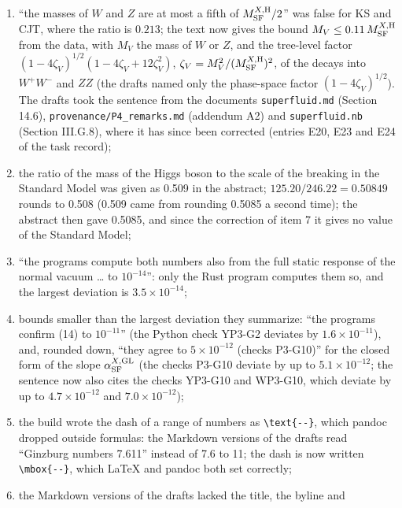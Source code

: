 \documentclass[
  10pt,
]{article}
\providecommand{\tightlist}{%
  \setlength{\itemsep}{0pt}\setlength{\parskip}{0pt}}
\begin{document}
\begin{enumerate}
\def\labelenumi{\arabic{enumi}.}
\tightlist
\item
  ``the masses of \(W\) and \(Z\) are at most a fifth of
  \(M^{X,{\rm H}}_{\rm SF}/2\)'' was false for KS and CJT, where the
  ratio is \(0.213\); the text now gives the bound
  \(M_V\le0.11\,M^{X,{\rm H}}_{\rm SF}\) from the data, with \(M_V\) the
  mass of \(W\) or \(Z\), and the tree-level factor
  \((1-4\zeta_V)^{1/2}(1-4\zeta_V+12\zeta_V^2)\),
  \(\zeta_V=M_V^2/(M^{X,{\rm H}}_{\rm SF})^2\), of the decays into
  \(W^+W^-\) and \(ZZ\) (the drafts named only the phase-space factor
  \((1-4\zeta_V)^{1/2}\)). The drafts took the sentence from the
  documents \texttt{superfluid.md} (Section 14.6),
  \texttt{provenance/P4\_remarks.md} (addendum A2) and
  \texttt{superfluid.nb} (Section III.G.8), where it has since been
  corrected (entries E20, E23 and E24 of the task record);
\item
  the ratio of the mass of the Higgs boson to the scale of the breaking
  in the Standard Model was given as 0.509 in the abstract;
  \(125.20/246.22=0.50849\) rounds to 0.508 (0.509 came from rounding
  0.5085 a second time); the abstract then gave 0.5085, and since the
  correction of item 7 it gives no value of the Standard Model;
\item
  ``the programs compute both numbers also from the full static response
  of the normal vacuum \ldots{} to \(10^{-14}\)'': only the Rust program
  computes them so, and the largest deviation is \(3.5\times10^{-14}\);
\item
  bounds smaller than the largest deviation they summarize: ``the
  programs confirm (14) to \(10^{-11}\)'' (the Python check YP3-G2
  deviates by \(1.6\times10^{-11}\)), and, rounded down, ``they agree to
  \(5\times10^{-12}\) (checks P3-G10)'' for the closed form of the slope
  \(\alpha^{X,{\rm GL}}_{\rm SF}\) (the checks P3-G10 deviate by up to
  \(5.1\times10^{-12}\); the sentence now also cites the checks YP3-G10
  and WP3-G10, which deviate by up to \(4.7\times10^{-12}\) and
  \(7.0\times10^{-12}\));
\item
  the build wrote the dash of a range of numbers as
  \texttt{\textbackslash{}text\{-\/-\}}, which pandoc dropped outside
  formulas: the Markdown versions of the drafts read ``Ginzburg numbers
  7.611'' instead of 7.6 to 11; the dash is now written
  \texttt{\textbackslash{}mbox\{-\/-\}}, which LaTeX and pandoc both set
  correctly;
\item
  the Markdown versions of the drafts lacked the title, the byline and

\end{enumerate}
\end{document}
